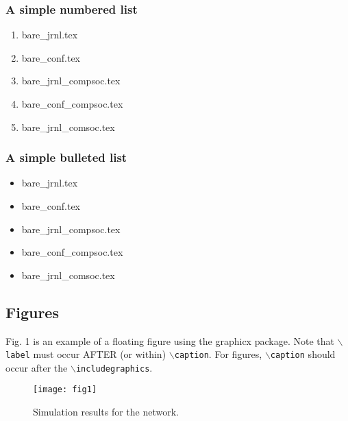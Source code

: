 \documentclass[lettersize,journal]{IEEEtran}
\begin{document}
    \subsubsection*{\bf A simple numbered list}
    \begin{enumerate}
        \item{bare\_jrnl.tex}
        \item{bare\_conf.tex}
        \item{bare\_jrnl\_compsoc.tex}
        \item{bare\_conf\_compsoc.tex}
        \item{bare\_jrnl\_comsoc.tex}
    \end{enumerate}

    \subsubsection*{\bf A simple bulleted list}
    \begin{itemize}
        \item{bare\_jrnl.tex}
        \item{bare\_conf.tex}
        \item{bare\_jrnl\_compsoc.tex}
        \item{bare\_conf\_compsoc.tex}
        \item{bare\_jrnl\_comsoc.tex}
    \end{itemize}





    \subsection{Figures}
    Fig. 1 is an example of a floating figure using the graphicx package.
    Note that $\backslash${\tt{label}} must occur AFTER (or within) $\backslash${\tt{caption}}.
    For figures, $\backslash${\tt{caption}} should occur after the $\backslash${\tt{includegraphics}}.

    \begin{figure}[!t]
        \centering
        \texttt{[image: fig1]}
        \caption{Simulation results for the network.}
        \label{fig_1}
    \end{figure}
\end{document}
